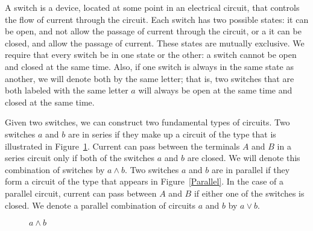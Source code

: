  
A {\bfi switch\/} is a device, located at
some point in an electrical circuit, that controls the flow of current
through the circuit. Each switch has two possible states: it can
be {\bfi open}, and not allow the passage of current
through the circuit,  or a it can be {\bfi
closed}, and allow the passage of current. These
states are mutually exclusive. We require that every switch be in one 
state or the other: a switch cannot be open and closed at the same
time.  Also, if one switch is always in the same state as another, we
will denote both by the same letter; that is, two switches that are
both labeled with the same letter $a$ will always be open at the same
time and closed at the same time.  
 
 
Given two switches, we can construct two fundamental types of
circuits. Two switches $a$ and $b$ are in {\bfi
series\/} if they make up a circuit of the type
that is illustrated in Figure~\ref{Series}. Current can pass between
the terminals $A$ and $B$ in a series circuit only if both of the
switches $a$ and $b$ are closed. We will denote this combination of
switches by $a \wedge b$. Two switches $a$ and $b$ are in {\bfi
parallel\/} if they form a circuit
of the type that appears in Figure~\ref{Parallel}.  In the case of a
parallel circuit, current can pass between $A$ and $B$ if
either one of the switches is closed.  We denote a parallel
combination of circuits $a$ and $b$ by $a \vee b$.   



\begin{figure}[htb]
\begin{center}

\end{center}
\caption{$a \wedge b$}
\label{Series}
\end{figure}



